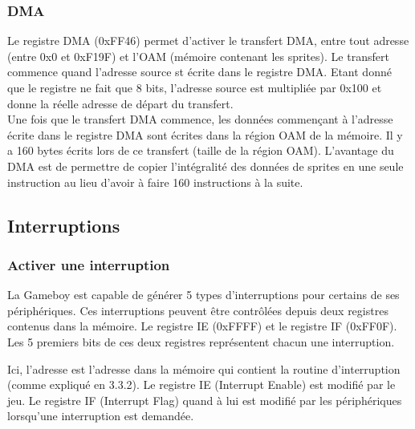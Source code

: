 \documentclass[a4paper]{article}
\begin{document}
\subsubsection{DMA}
Le registre DMA (0xFF46) permet d'activer le transfert DMA, entre tout adresse
(entre 0x0 et 0xF19F) et l'OAM (mémoire contenant les sprites). Le transfert commence
quand l'adresse source st écrite dans le registre DMA. Etant donné que le registre
ne fait que 8 bits, l'adresse source est multipliée par 0x100 et donne la réelle
adresse de départ du transfert. \\

Une fois que le transfert DMA commence, les données commençant à l'adresse
écrite dans le registre DMA sont écrites dans la région OAM de la mémoire.
Il y a 160 bytes écrits lors de ce transfert (taille de la région OAM).  L'avantage 
du DMA est de permettre de copier l'intégralité des données de sprites en une seule 
instruction au lieu d'avoir à faire 160 instructions à la suite.


\subsection{Interruptions}

\subsubsection{Activer une interruption}
La Gameboy est capable de générer 5 types d'interruptions pour certains de ses
périphériques. Ces interruptions peuvent être contrôlées depuis deux registres
contenus dans la mémoire. Le registre IE (0xFFFF) et le registre IF (0xFF0F).
Les 5 premiers bits de ces deux registres représentent chacun une interruption.
\begin{center}
\end{center}
Ici, l'adresse est l'adresse dans la mémoire qui contient la routine d'interruption
(comme expliqué en 3.3.2). Le registre IE (Interrupt Enable) est modifié par le jeu.
Le registre IF (Interrupt Flag) quand à lui est modifié par les périphériques lorsqu'une 
interruption est demandée. \\
\end{document}
